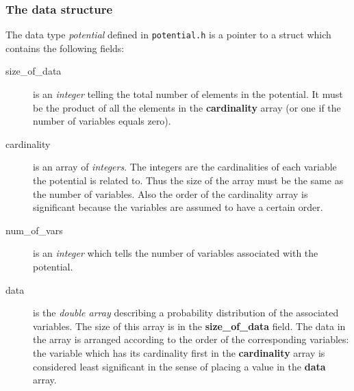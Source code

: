 \documentclass[12pt,a4paper]{report}
\begin{document}
\subsubsection{The data structure}
The data type {\it potential} defined in \verb+potential.h+ is a
pointer to a struct which contains the following fields:
\begin{description}
\item[size\_of\_data] is an {\it integer} telling the total number of 
elements in the potential. It must be the product of all the elements 
in the \textbf{cardinality} array (or one if the number of variables 
equals zero).

\item[cardinality] is an array of {\it integers}. The integers are the
cardinalities of each variable the potential is related to. Thus the
size of the array must be the same as the number of variables. Also
the order of the cardinality array is significant because the
variables are assumed to have a certain order.

\item[num\_of\_vars] is an {\it integer} which tells the number of variables
associated with the potential.

\item[data] is the {\it double array} describing a probability
distribution of the associated variables. The size of this array is in
the \textbf{size\_of\_data} field. The data in the array is arranged
according to the order of the corresponding variables: the variable
which has its cardinality first in the \textbf{cardinality} array is
considered least significant in the sense of placing a value in the
\textbf{data} array. 

\end{description}
\end{document}

